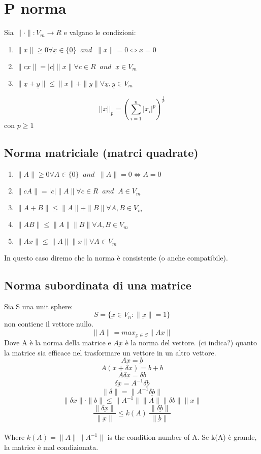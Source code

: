 \section{P norma}
Sia $\|\cdot\|:V_m \rightarrow R$
e valgano le condizioni:

\begin{enumerate}
\item $\|x\| \ge 0 \forall \underline{x} \in \{\underbar{0}\}\;\; and \;\; \|x\|=0 \iff x=0$
\item $\|c\underbar{x}\|=|c|\|x\| \forall c \in R \;\; and \;\; \underline{x} \in V_m$
\item $\|\underline{x}+\underline{y}\| \le \|x\|+\|y\| \forall \underline{x},\underline{y} \in V_m$
\end{enumerate}

\[||x||_p=(\sum_{i=1}^{n}|x_i|^p)^{\frac{1}{p}}\] con $p \ge 1$

\subsection{Norma matriciale (matrci quadrate)}
\begin{enumerate}
\item $\|A\| \ge 0 \forall A \in \{\underbar{0}\}\;\; and \;\; \|A\|=0 \iff A=0$
\item $\|cA\|=|c|\|A\| \forall c \in R \;\; and \;\; A \in V_m$
\item $\|A+B\| \le \|A\|+\|B\| \forall A,B \in V_m$
\item $\|AB\| \le \|A\|\|B\| \forall A,B \in V_m$
\item $\|A\underbar{x}\|\le\|A\| \|\underbar{x}\| \forall A \in V_m$
\end{enumerate}
In questo caso diremo che la norma è consistente (o anche compatibile).

\subsection{Norma subordinata di una matrice}
Sia S una unit sphere:
\[S=\{\underbar{x} \in V_n: \|\underbar{x}\|=1\}\] non contiene il vettore nullo.
\[\|A\|=max_{\underbar{x} \in S}\|A\underbar{x}\|\] Dove A è la norma della matrice e $A\underbar{x}$ è la norma del vettore.
(ci indica?) quanto la matrice sia efficace nel trasformare un vettore in un altro vettore.
\[A\underbar{x}=\underbar{b}\]
\[A(\underbar{x}+\delta \underbar{x})=b+\underbar{b}\]
\[A\delta \underbar{x}=\delta \underbar{b}\]
\[ \delta \underbar{x} =A^{-1}\delta \underbar{b}\]
\[ \|\delta\|=\|A^{-1}\delta \underbar{b}\|\]
\[ \|\delta \underbar{x}\|\cdot \|\underbar{b}\| \le \|A^{-1}\| \|A\| \|\delta \underbar{b}\|\|\underbar{x}\|\]
\[ \frac{\|\delta \underbar{x}\|}{\|\underbar{x}\|} \le k(A)\ \frac{\|\delta \underbar{b}\|}{\|\underbar{b}\|}\]
\\
Where $k(A)=\|A\|\|A^{-1}\|$ is the condition number of A. Se k(A) è grande, la matrice è mal condizionata.


